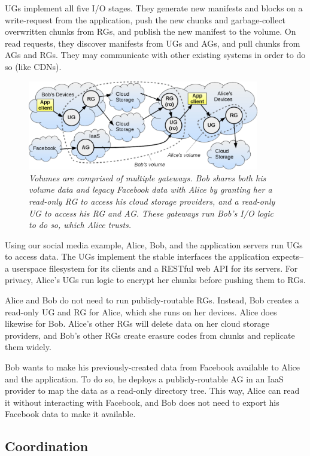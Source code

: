 UGs implement all five I/O stages. They generate new manifests and blocks on a
write-request from the application, push the new chunks and garbage-collect
overwritten chunks from RGs, and publish the new manifest to the volume. On read
requests, they discover manifests from UGs and AGs, and pull chunks from AGs and
RGs. They may communicate with other existing systems in order to do so (like
CDNs).

\begin{figure}
\centering
\includegraphics[width=0.9\textwidth]{figures/volume-gateway}
\caption{\it Volumes are comprised of multiple gateways.  Bob shares both his
volume data and legacy Facebook data with Alice by granting her a read-only RG
to access his cloud storage providers, and a read-only UG to access his RG and
AG.  These gateways run Bob's I/O logic to do so, which Alice trusts.}
\label{fig:volume-gateway}
\end{figure}

Using our social media example, Alice, Bob, and the application servers run UGs
to access data. The UGs implement the stable interfaces the application
expects--a userspace filesystem for its clients and a RESTful web API for its
servers. For privacy, Alice's UGs run logic to encrypt her chunks before
pushing them to RGs.

Alice and Bob do not need to run publicly-routable RGs. Instead, Bob creates
a read-only UG and RG for Alice, which she runs on her devices. Alice does
likewise for Bob.  Alice's other RGs will delete data on her cloud storage
providers, and Bob's other RGs create erasure codes from chunks and
replicate them widely.

Bob wants to make his previously-created data from Facebook available to Alice
and the application.  To do so, he deploys a publicly-routable AG in an IaaS
provider to map the data as a read-only directory tree. This way, Alice can
read it without interacting with Facebook, and Bob does not need to export his
Facebook data to make it available.

\subsection{Coordination}


